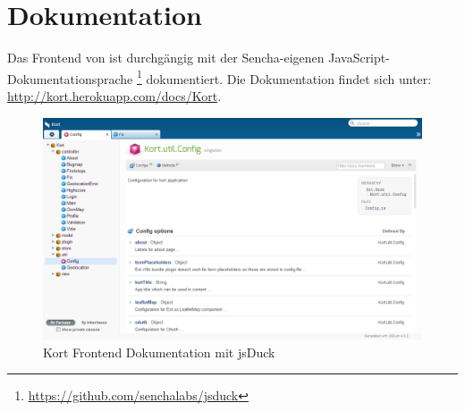 \section{Dokumentation}

Das Frontend von \kort ist durchgängig mit der Sencha-eigenen JavaScript-Dokumentationsprache \footnote{\url{https://github.com/senchalabs/jsduck}} dokumentiert.
Die Dokumentation findet sich unter: \url{http://kort.herokuapp.com/docs/Kort}.

\begin{figure}[H]
	\centering
	\includegraphics[width=\textwidth]{images/implementation/frontend/kort-documentation}
	\caption{Kort Frontend Dokumentation mit jsDuck}
	\label{image-kort-documentation}
\end{figure}